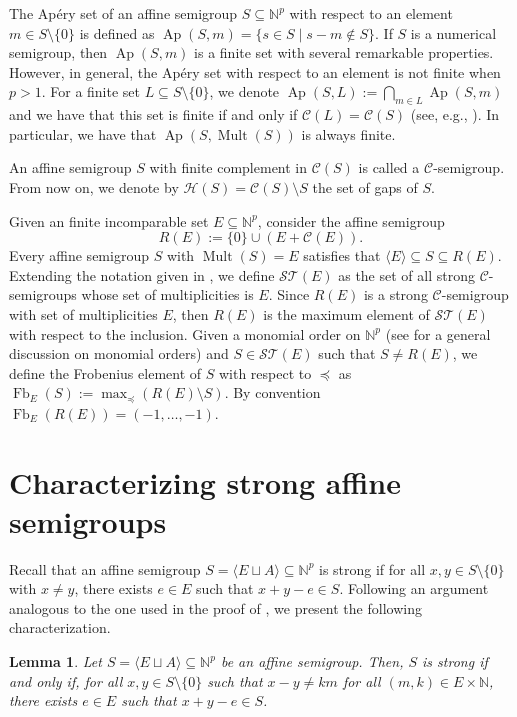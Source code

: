 \documentclass[a4paper,11pt]{article}
\newtheorem{lemma}[theorem]{Lemma}
\def\CaH{\mathcal{H}}
\def\CaC{\mathcal{C}}
\def\N{\mathbb{N}}
\def\Fb{\operatorname{Fb}}
\def\Ap{\operatorname{Ap}}
\def\Mult{\operatorname{Mult}}
\begin{document}
{The Apéry set of an affine semigroup $S\subseteq \N^p$ with respect to an element $m\in S\setminus\{0\}$ is defined as $\Ap(S,m)=\{s\in S\mid s-m\notin S\}$. If $S$ is a numerical semigroup, then $\Ap(S,m)$ is a finite set with several remarkable properties. However, in general, the Apéry set with respect to an element is not finite when $p>1$. For a finite set $L \subseteq S \setminus \{0\}$, we denote $\Ap(S,L) := \bigcap_{m\in L} \Ap (S,m)$ and we have that this set is finite if and only if $\CaC(L) = \CaC(S)$ (see, e.g., \cite[Theorem 2.6]{GGM}). In particular, we have that $\Ap(S, \Mult(S))$ is always finite.

An affine semigroup $S$ with finite complement in $\CaC(S)$ is called a $\CaC$-semigroup. From now on, we denote by $\CaH(S)=\CaC(S)\setminus S$ the set of gaps of $S$.

Given an finite incomparable set $E \subseteq \N^p$, consider the affine semigroup \[ R(E) := \{0\} \cup (E + \mathcal{C}(E)).\]
Every affine semigroup $S$ with $\Mult(S) = E$ satisfies that $\langle E \rangle \subseteq S  \subseteq R(E).$ Extending the notation given in \cite{Strong nuevo de JC}, we define $\mathcal{ST}(E)$ as the set of all strong $\CaC$-semigroups whose set of multiplicities is $E$. Since $R(E)$ is a strong $\CaC$-semigroup with set of multiplicities $E$, then $R(E)$ is the maximum element of $\mathcal{ST}(E)$ with respect to the inclusion.
Given a monomial order on $\N^p$ (see \cite{CoxLO} for a general discussion on monomial orders) and $S \in \mathcal{ST}(E)$ such that $S \neq R(E)$, we define the Frobenius element of $S$ with respect to $\preceq$ as $\Fb_{E}(S):=\max_{\preceq}(R(E)\setminus S)$. By convention  $\Fb_{E}(R(E))=(-1,\ldots ,-1)$.


\section{Characterizing strong affine semigroups}\label{sec:chra}
Recall that an affine semigroup $S=\langle E\sqcup A\rangle\subseteq\N^p$ is strong if for all $x,y\in S\setminus\{0\}$ with $x\neq y$, there exists $e\in E$ such that $x+y-e\in S$.  Following an argument analogous to the one used in the proof of \cite[Proposition 2]{Strong nuevo de JC}, we present the following characterization.

\begin{lemma}
Let $S=\langle E\sqcup A\rangle\subseteq \N^p$ be an affine semigroup. Then, $S$ is strong if and only if, for all $x,y\in S\setminus\{0\}$ such that $x- y \neq km$ for all $(m,k)\in E\times \N$, there exists $e\in E$ such that $x+y-e\in S$.
\end{lemma}

}
\end{document}
